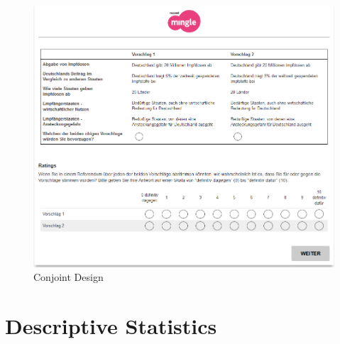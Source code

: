 \documentclass[12pt,oneside,smallheadings,chapterprefix=true]{article}
\begin{document}
\begin{figure}[hbt!]
\includegraphics[width=\linewidth]{2_figures/screenshot.png}
\caption{Conjoint Design}
\label{fig:conjoint}

\end{figure}



\newpage




\clearpage
\section{Descriptive Statistics}  

\end{document}
